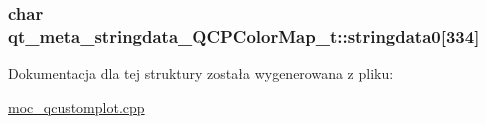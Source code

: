 \subsubsection[{\texorpdfstring{stringdata0}{stringdata0}}]{\setlength{\rightskip}{0pt plus 5cm}char qt\+\_\+meta\+\_\+stringdata\+\_\+\+Q\+C\+P\+Color\+Map\+\_\+t\+::stringdata0\mbox{[}334\mbox{]}}\hypertarget{structqt__meta__stringdata___q_c_p_color_map__t_a2edec26054af0f1b2cc81406b21fca92}{}\label{structqt__meta__stringdata___q_c_p_color_map__t_a2edec26054af0f1b2cc81406b21fca92}


Dokumentacja dla tej struktury została wygenerowana z pliku\+:\begin{DoxyCompactItemize}
\item 
\hyperlink{moc__qcustomplot_8cpp}{moc\+\_\+qcustomplot.\+cpp}\end{DoxyCompactItemize}
